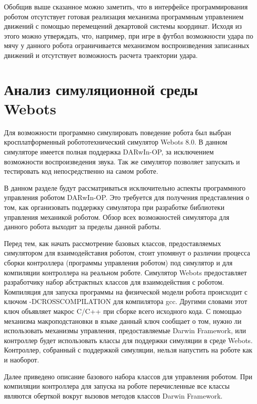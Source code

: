 Обобщив выше сказанное можно заметить, что в интерфейсе программирования роботом отсутствует готовая реализация механизма программным управлением движений с помощью перемещений декартовой системы координат. Исходя из этого можно утверждать, что, например, при игре в футбол возможности удара по мячу у данного робота ограничивается механизмом воспроизведения записанных движений и отсутствует возможность расчета траектории удара. 

\section{Анализ симуляционной среды Webots}

Для возможности программно симулировать поведение робота был выбран кросплатформенный робототехнический симулятор Webots 8.0. В данном симуляторе имеется полная поддержка DARwIn-OP, за исключением возможности воспроизведения звука. Так же симулятор позволяет запускать и тестировать код непосредственно на самом роботе.

В данном разделе будут рассматриваться исключительно аспекты программного управления роботом DARwIn-OP. Это требуется для получения представления о том, как организовать поддержку симулятора при разработке библиотеки управления механикой роботом. Обзор всех возможностей симулятора для данного робота выходит за пределы данной работы.

Перед тем, как начать рассмотрение базовых классов, предоставляемых симулятором для взаимодейставия роботом, стоит упомянут о различии процесса сборки контроллера (программы управления роботом) под симулятор и для компиляции контроллера на реальном роботе. Симулятор Webots предоставляет разработчику набор абстрактных классов для взаимодействия с роботом. Компиляция для запуска программы на физической модели робота происходит с ключом -DCROSSCOMPILATION для компилятора gcc. Другими словами этот ключ объявляет макрос C/C++ при сборке всего исходного кода. С помощью механизма макроподстановки в языке данный ключ сообщает о том, нужно ли использовать механизмы управления, предоставляемые Darwin Framework, или контроллер будет использовать классы для поддержки симуляции в среде Webots. Контроллер, собранный с поддержкой симуляции, нельзя напустить на роботе как и наоборот.

Далее приведено описание базового набора классов для управления роботом. При компиляции контроллера для запуска на роботе перечисленные все классы являются оберткой вокруг вызовов методов классов Darwin Framework.


